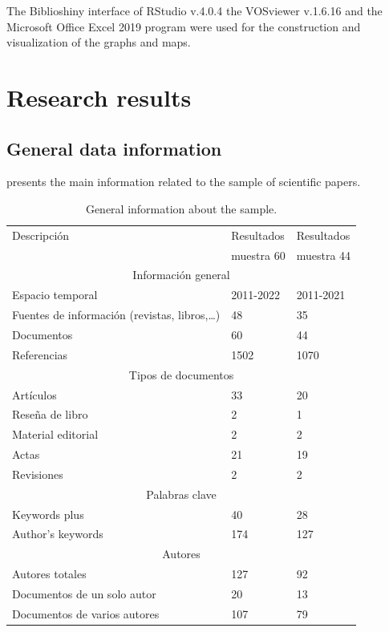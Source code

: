 \documentclass[english]{textolivre}
\begin{document}
The Biblioshiny interface of RStudio v.4.0.4 \cite{aria_bibliometrix_2017} the VOSviewer v.1.6.16 \cite{van_eck_software_2010} and the Microsoft Office Excel 2019 program were used for the construction and visualization of the graphs and maps.

\section{Research results}

\subsection{General data information}

 presents the main information related to the sample of scientific papers.

\begin{table}[h!]
\centering
\begin{threeparttable}
\caption{General information about the sample.}\label{tbl01}
\begin{tabular}{lll}
\toprule
Descripción & Resultados & Resultados \\
 & muestra 60 & muestra 44 \\
\midrule
\multicolumn{3}{c}{Información general} \\
Espacio temporal & 2011-2022 & 2011-2021 \\
Fuentes de información (revistas, libros,\ldots) & 48 & 35 \\
Documentos & 60 & 44 \\
Referencias & 1502 & 1070 \\
\midrule
\multicolumn{3}{c}{Tipos de documentos} \\
Artículos & 33 & 20 \\ 
Reseña de libro & 2 & 1 \\
Material editorial & 2 & 2 \\
Actas & 21 & 19 \\
Revisiones & 2 & 2 \\
\midrule
\multicolumn{3}{c}{Palabras clave} \\
Keywords plus & 40 & 28 \\
Author’s keywords & 174 & 127 \\
\midrule
\multicolumn{3}{c}{Autores} \\
Autores totales & 127 &  92 \\
Documentos de un solo autor & 20 & 13 \\
Documentos de varios autores & 107 & 79 \\
\bottomrule
\end{tabular}
\end{threeparttable}
\end{table}
\end{document}
